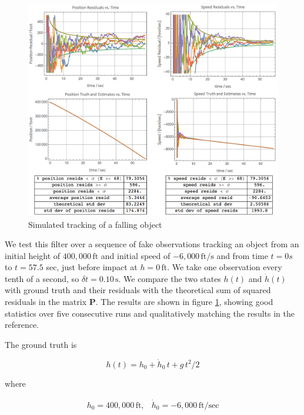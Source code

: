 \documentclass[10pt,oneside,x11names]{article}
\begin{document}
\begin{figure}[htb]
\centering
\includegraphics[width=.9\linewidth]{BigResults.png}
\caption{\label{fig:orgparagraph1}
Simulated tracking of a falling object}
\end{figure}

\noindent We test this filter over a sequence of fake
observations tracking an object from an initial height of \(400,000\,\textrm{ft}\)
and initial speed of \(-6,000\,\textrm{ft}/\textrm{s}\) and from time \(t=\si{0}{s}\)
to \(t=57.5\) sec, just before impact at \(h=0\,\textrm{ft}\). We take one
observation every tenth of a second, so \(\delta t={0.10}\,\textrm{s}\). We compare the
two states \(h(t)\) and \(\dot{h}(t)\) with ground truth and their residuals with
the theoretical sum of squared residuals in the matrix \(\mathbold{P}\). The
results are shown in figure \ref{fig:orgparagraph1}, showing good statistics over five
consecutive runs and qualitatively matching the results in the reference.

The ground truth is

\begin{equation*}
h(t) = h_0 + {\dot{h}}_0\,t + g\,t^2/2
\end{equation*}

\noindent where

\begin{equation*}
\begin{matrix}
h_0 = 400,000\,\textrm{ft}, & {\dot{h}}_0 = -6,000\,\textrm{ft}/\textrm{sec}
\end{matrix}
\end{equation*}
\end{document}
